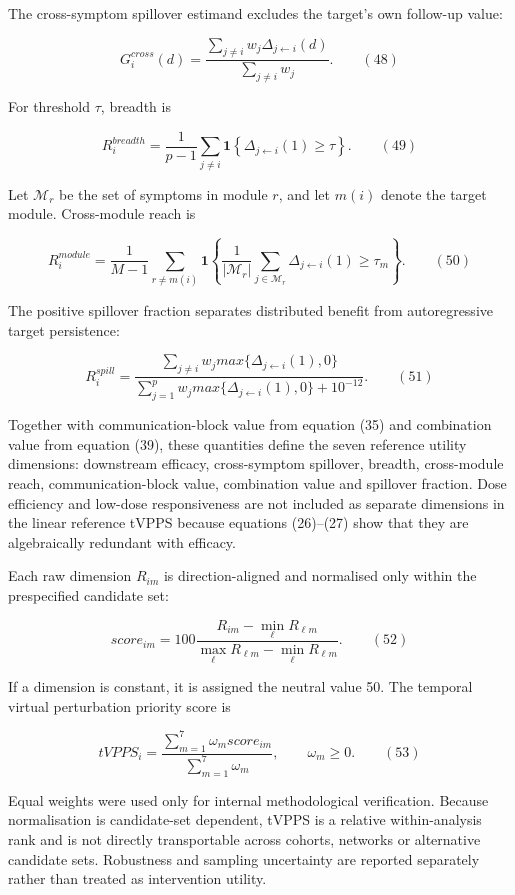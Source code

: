 \documentclass[11pt]{article}
\begin{document}
The cross-symptom spillover estimand excludes the target's own follow-up
value:

\[G_{i}^{cross}(d) = \frac{\sum_{j \neq i}^{}w_{j}\Delta_{j \leftarrow i}(d)}{\sum_{j \neq i}^{}w_{j}}.\quad\quad(48)\]

For threshold \(\tau\), breadth is

\[R_{i}^{breadth} = \frac{1}{p - 1}\sum_{j \neq i}^{}\mathbf{1}\left\{ \Delta_{j \leftarrow i}(1) \geq \tau \right\}.\quad\quad(49)\]

Let \(\mathcal{M}_{r}\) be the set of symptoms in module \(r\), and let
\(m(i)\) denote the target module. Cross-module reach is

\[R_{i}^{module} = \frac{1}{M - 1}\sum_{r \neq m(i)}^{}\mathbf{1}\left\{ \frac{1}{\left| \mathcal{M}_{r} \right|}\sum_{j \in \mathcal{M}_{r}}^{}\Delta_{j \leftarrow i}(1) \geq \tau_{m} \right\}.\quad\quad(50)\]

The positive spillover fraction separates distributed benefit from
autoregressive target persistence:

\[R_{i}^{spill} = \frac{\sum_{j \neq i}^{}w_{j}max\{\Delta_{j \leftarrow i}(1),0\}}{\sum_{j = 1}^{p}w_{j}max\{\Delta_{j \leftarrow i}(1),0\} + 10^{- 12}}.\quad\quad(51)\]

Together with communication-block value from equation (35) and
combination value from equation (39), these quantities define the seven
reference utility dimensions: downstream efficacy, cross-symptom
spillover, breadth, cross-module reach, communication-block value,
combination value and spillover fraction. Dose efficiency and low-dose
responsiveness are not included as separate dimensions in the linear
reference tVPPS because equations (26)--(27) show that they are
algebraically redundant with efficacy.

Each raw dimension \(R_{im}\) is direction-aligned and normalised only
within the prespecified candidate set:

\[{score}_{im} = 100\frac{R_{im} - \min_{\ell}R_{\ell m}}{\max_{\ell}R_{\ell m} - \min_{\ell}R_{\ell m}}.\quad\quad(52)\]

If a dimension is constant, it is assigned the neutral value 50. The
temporal virtual perturbation priority score is

\[{tVPPS}_{i} = \frac{\sum_{m = 1}^{7}\omega_{m}{score}_{im}}{\sum_{m = 1}^{7}\omega_{m}},\quad\quad\omega_{m} \geq 0.\quad\quad(53)\]

Equal weights were used only for internal methodological verification.
Because normalisation is candidate-set dependent, tVPPS is a relative
within-analysis rank and is not directly transportable across cohorts,
networks or alternative candidate sets. Robustness and sampling
uncertainty are reported separately rather than treated as intervention
utility.
\end{document}

